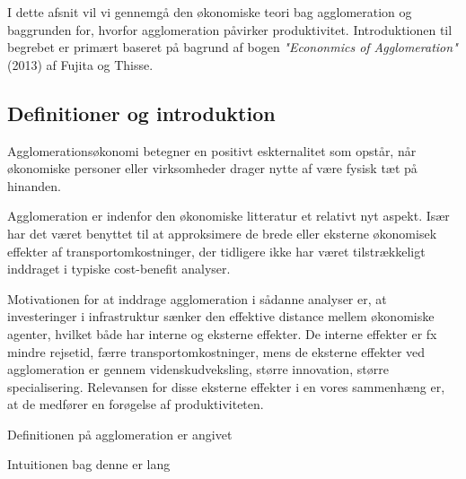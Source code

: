 
I dette afsnit vil vi gennemgå den økonomiske teori bag agglomeration og baggrunden for, hvorfor agglomeration påvirker produktivitet. Introduktionen til begrebet er primært baseret på bagrund af bogen \emph{"Econonmics of Agglomeration"} (2013) af Fujita og Thisse.

\subsection{Definitioner og introduktion}
Agglomerationsøkonomi betegner en positivt eskternalitet som opstår, når økonomiske personer eller virksomheder drager nytte af være fysisk tæt på hinanden. 

Agglomeration er indenfor den økonomiske litteratur et relativt nyt aspekt. Især har det været benyttet til at approksimere de brede eller eksterne økonomisek effekter af transportomkostninger, der tidligere ikke har været tilstrækkeligt inddraget i typiske cost-benefit analyser.

Motivationen for at inddrage agglomeration i sådanne analyser er, at investeringer i infrastruktur sænker den effektive distance mellem økonomiske agenter, hvilket både har interne og eksterne effekter. De interne effekter er fx mindre rejsetid, færre transportomkostninger, mens de eksterne effekter ved agglomeration er gennem videnskudveksling, større innovation, større specialisering. Relevansen for disse eksterne effekter i en vores sammenhæng er, at de medfører en forøgelse af produktiviteten.

Definitionen på agglomeration er angivet

Intuitionen bag denne er lang


